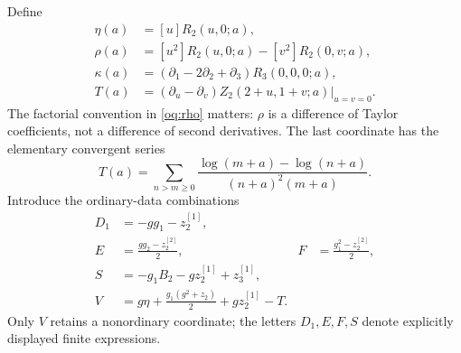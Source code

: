 \documentclass[11pt,a4paper]{article}
\numberwithin{equation}{section}
\theoremstyle{definition}
\theoremstyle{remark}
\begin{document}
Define
\begin{align}
 \eta(a)&=[u]R_2(u,0;a),\label{oq:eta}\\
 \rho(a)&=[u^2]R_2(u,0;a)-[v^2]R_2(0,v;a),\label{oq:rho}\\
 \kappa(a)&=(\partial_1-2\partial_2+\partial_3)R_3(0,0,0;a),
 \label{oq:kappa}\\
 T(a)&=(\partial_u-\partial_v)Z_2(2+u,1+v;a)\big|_{u=v=0}.
 \label{oq:T}
\end{align}
The factorial convention in \eqref{oq:rho} matters: $\rho$ is a
difference of Taylor coefficients, not a difference of second derivatives.
The last coordinate has the elementary convergent series
\begin{equation}\label{oq:Tseries}
 T(a)=\sum_{n>m\ge0}
 \frac{\log(m+a)-\log(n+a)}{(n+a)^2(m+a)}.
\end{equation}
Introduce the ordinary-data combinations
\begin{align}
 D_1&=-gg_1-z_2^{[1]},\label{oq:D1}\\
 E&=\frac{gg_2-z_2^{[2]}}2,
 &F&=\frac{g_1^2-z_2^{[2]}}2,\label{oq:EF}\\
 S&=-g_1B_2-gz_2^{[1]}+z_3^{[1]},\label{oq:S}\\
 V&=g\eta+\frac{g_1(g^2+z_2)}2+gz_2^{[1]}-T.
 \label{oq:V}
\end{align}
Only $V$ retains a nonordinary coordinate; the letters $D_1,E,F,S$
denote explicitly displayed finite expressions.
\end{document}
